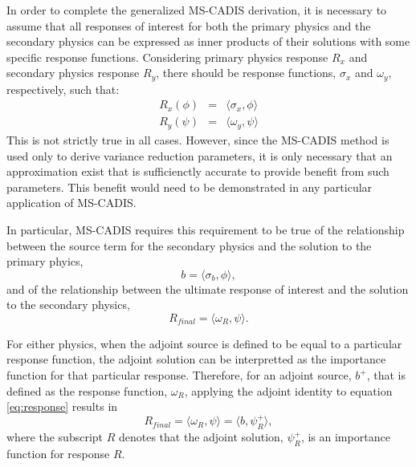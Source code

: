 In order to complete the generalized MS-CADIS derivation, it is necessary to
assume that all responses of interest for both the primary physics and the
secondary physics can be expressed as inner products of their solutions with
some specific response functions.  Considering primary physics response $R_x$
and secondary physics response $R_y$, there should be response functions,
$\sigma_x$ and $\omega_y$, respectively, such that:
\begin{eqnarray}
   R_x(\phi) &=& \langle \sigma_x , \phi \rangle\\
   R_y(\psi) &=& \langle \omega_y , \psi \rangle
\end{eqnarray}
This is not strictly true in all cases.  However, since the
MS-CADIS method is used only to derive variance reduction parameters, it is
only necessary that an approximation exist that is sufficienctly accurate to
provide benefit from such parameters.  This benefit would need to be
demonstrated in any particular application of MS-CADIS.

In particular, MS-CADIS requires this requirement to be true of the
relationship between the source term for the secondary physics and the
solution to the primary phyics,
\begin{equation}\label{eq:coupling}
  b = \langle \sigma_b, \phi \rangle,
\end{equation}
and of the relationship between the ultimate response of interest and the
solution to the secondary physics,
\begin{equation} \label{eq:response}
  R_{final} = \langle \omega_R, \psi \rangle.
\end{equation}

For either physics, when the adjoint source is defined to be equal to a
particular response function, the adjoint solution can be interpretted as the
importance function for that particular response.  Therefore, for an adjoint source,
$b^{+}$, that is defined as the response function, $\omega_R$, applying the
adjoint identity to equation \ref{eq:response} results in
\begin{equation}
  R_{final} = \langle \omega_R, \psi \rangle = \langle b, \psi_R^{+}\rangle,
\end{equation}
where the subscript $R$ denotes that the adjoint solution, $\psi_R^{+}$, is an
importance function for response $R$.

